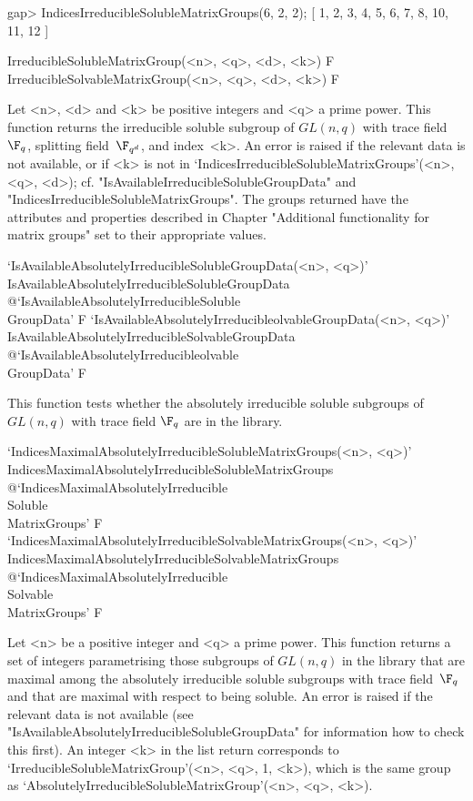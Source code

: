 \beginexample
gap> IndicesIrreducibleSolubleMatrixGroups(6, 2, 2);
[ 1, 2, 3, 4, 5, 6, 7, 8, 10, 11, 12 ]
\endexample

\>IrreducibleSolubleMatrixGroup(<n>, <q>, <d>, <k>) F
\>IrreducibleSolvableMatrixGroup(<n>, <q>, <d>, <k>) F

Let <n>, <d> and <k> be  positive integers and <q> a prime power. This
function returns the irreducible soluble subgroup of $GL(n,q)$ with trace field $\F_q$, 
splitting field~$\F_{q^d}$, and index~<k>.
An error is raised if the relevant
data is not available, or if <k> is not in  
`IndicesIrreducibleSolubleMatrixGroups'(<n>, <q>, <d>); cf. "IsAvailableIrreducibleSolubleGroupData" and "IndicesIrreducibleSolubleMatrixGroups".
The groups returned have the attributes and properties described in
Chapter "Additional functionality for matrix groups" set to their appropriate values.


\>`IsAvailableAbsolutelyIrreducibleSolubleGroupData(<n>, <q>)'%
{IsAvailableAbsolutelyIrreducibleSolubleGroupData}%
@{`IsAvailableAbsolutelyIrreducibleSoluble\\GroupData'} F
\>`IsAvailableAbsolutelyIrreducibleolvableGroupData(<n>, <q>)'%
{IsAvailableAbsolutelyIrreducibleSolvableGroupData}%
@{`IsAvailableAbsolutelyIrreducibleolvable\\GroupData'} F

This function tests whether the
absolutely irreducible soluble subgroups of $GL(n,q)$ with trace field $\F_q$ are in the {\IRREDSOL} library.




\>`IndicesMaximalAbsolutelyIrreducibleSolubleMatrixGroups(<n>, <q>)'%
{IndicesMaximalAbsolutelyIrreducibleSolubleMatrixGroups}%
@{`IndicesMaximalAbsolutelyIrreducible\\Soluble\\MatrixGroups'} F
\>`IndicesMaximalAbsolutelyIrreducibleSolvableMatrixGroups(<n>, <q>)'%
{IndicesMaximalAbsolutelyIrreducibleSolvableMatrixGroups}%
@{`IndicesMaximalAbsolutelyIrreducible\\Solvable\\MatrixGroups'} F

Let <n> be a  positive integer and <q> a prime power. This
function returns a set of integers parametrising those subgroups of $GL(n, q)$ in the
{\IRREDSOL} library that are maximal among the absolutely irreducible soluble subgroups with  trace field~$\F_q $ and that are maximal with
respect to being soluble. An error is raised if the relevant
data is not available (see "IsAvailableAbsolutelyIrreducibleSolubleGroupData" for information 
how to check this first). An integer <k> in the list return corresponds to `IrreducibleSolubleMatrixGroup'(<n>, <q>, 1, <k>), which is the same group as
`AbsolutelyIrreducibleSolubleMatrixGroup'(<n>, <q>, <k>).

